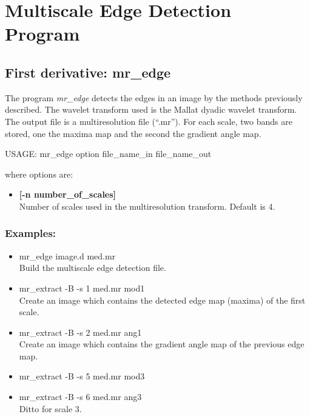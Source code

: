 \section{Multiscale Edge Detection Program}
\subsection{First derivative: mr\_edge}
The program {\em mr\_edge} detects the edges in an image by the
methods previously described. The wavelet transform used is 
the Mallat dyadic wavelet transform. The output file is a multiresolution
file (``.mr''). For each scale, two bands are stored, one 
the maxima map and the second the gradient angle map. 

{\bf
\begin{center}
     USAGE: mr\_edge option file\_name\_in file\_name\_out
\end{center}}
where options are: 
\begin{itemize} 
\item {\bf [-n number\_of\_scales]} \\
Number of scales used in the multiresolution transform.
Default is 4.
\end{itemize} 
\subsubsection*{Examples:}
\begin{itemize} 
\baselineskip=0.4truecm
\itemsep=0.1truecm
\item mr\_edge image.d med.mr \\
Build the multiscale edge detection file.
\item mr\_extract -B -s 1 med.mr mod1 \\
Create an image which contains the detected edge map (maxima) 
of the first scale.
\item mr\_extract -B -s 2 med.mr ang1 \\
Create an image which contains the  gradient angle map
of the previous edge map.
\item mr\_extract -B -s 5 med.mr mod3 \\
\item mr\_extract -B -s 6 med.mr ang3 \\
Ditto for scale 3.
\end{itemize} 

